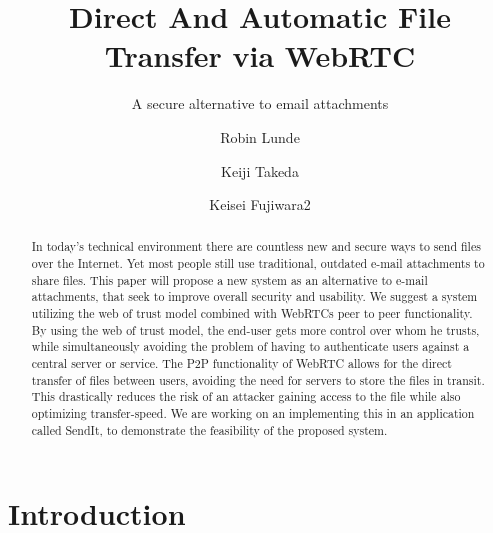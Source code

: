 \documentclass[runningheads]{llncs}
\begin{document}
%
\title{Direct And Automatic File Transfer via WebRTC}
\subtitle{A secure alternative to email attachments}
%
%
\author{Robin Lunde \and
Keiji Takeda \and Keisei Fujiwara{2}}
%
%
%
\maketitle              %
\begin{abstract}
In today's technical environment there are countless new and secure ways to send files over the Internet. Yet most people still use traditional, outdated e-mail attachments to share files. This paper will propose a new system as an alternative to e-mail attachments, that seek to improve overall security and usability. We suggest a system utilizing the web of trust model combined with WebRTCs peer to peer functionality.  By using the web of trust model, the end-user gets more control over whom he trusts, while simultaneously avoiding the problem of having to authenticate users against a central server or service. The P2P functionality of WebRTC allows for the direct transfer of files between users, avoiding the need for servers to store the files in transit. This drastically reduces the risk of an attacker gaining access to the file while also optimizing transfer-speed. We are working on an implementing this in an application called SendIt, to demonstrate the feasibility of the proposed system.
%
\end{abstract}
%
%
\section{Introduction}
%
\end{document}
